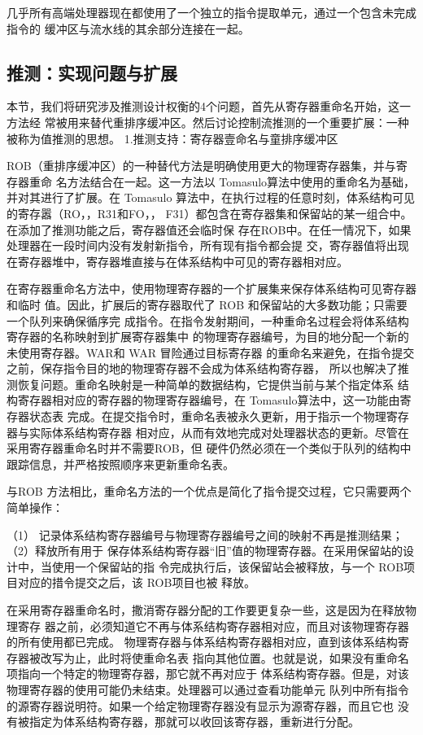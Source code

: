 几乎所有高端处理器现在都使用了一个独立的指令提取单元，通过一个包含未完成指令的
缓冲区与流水线的其余部分连接在一起。
\subsection{推测：实现问题与扩展}

本节，我们将研究涉及推测设计权衡的4个问题，首先从寄存器重命名开始，这一方法经
常被用来替代重排序缓冲区。然后讨论控制流推测的一个重要扩展：一种被称为值推测的思想。
1.推测支持：寄存器壹命名与童排序缓冲区

ROB（重排序缓冲区）的一种替代方法是明确使用更大的物理寄存器集，并与寄存器重命
名方法结合在一起。这一方法以 Tomasulo算法中使用的重命名为基础，并对其进行了扩展。在
Tomasulo 算法中，在执行过程的任意时刻，体系结构可见的寄存嚣（RO，，R31和FO，，
F31）都包含在寄存器集和保留站的某一组合中。在添加了推测功能之后，寄存器值还会临时保
存在ROB中。在任一情况下，如果处理器在一段时间内没有发射新指令，所有现有指令都会提
交，寄存器值将出现在寄存器堆中，寄存器堆直接与在体系结构中可见的寄存器相对应。

在寄存器重命名方法中，使用物理寄存器的一个扩展集来保存体系结构可见寄存器和临时
值。因此，扩展后的寄存器取代了 ROB 和保留站的大多数功能；只需要一个队列来确保循序完
成指令。在指令发射期间，一种重命名过程会将体系结构寄存器的名称映射到扩展寄存器集中
的物理寄存器编号，为目的地分配一个新的未使用寄存器。WAR和 WAR 冒险通过目标寄存器
的重命名来避免，在指令提交之前，保存指令目的地的物理寄存器不会成为体系结构寄存器，
所以也解决了推测恢复问题。重命名映射是一种简单的数据结构，它提供当前与某个指定体系
结构寄存器相对应的寄存器的物理寄存器编号，在 Tomasulo算法中，这一功能由寄存器状态表
完成。在提交指令时，重命名表被永久更新，用于指示一个物理寄存器与实际体系结构寄存器
相对应，从而有效地完成对处理器状态的更新。尽管在采用寄存器重命名时并不需要ROB，但
硬件仍然必须在一个类似于队列的结构中跟踪信息，并严格按照顺序来更新重命名表。

与ROB 方法相比，重命名方法的一个优点是简化了指令提交过程，它只需要两个简单操作：

（1） 记录体系结构寄存器编号与物理寄存器编号之间的映射不再是推测结果；（2）释放所有用于
保存体系结构寄存器“旧”值的物理寄存器。在采用保留站的设计中，当使用一个保留站的指
令完成执行后，该保留站会被释放，与一个 ROB项目对应的措令提交之后，该 ROB项目也被
释放。

在采用寄存器重命名时，撒消寄存器分配的工作要更复杂一些，这是因为在释放物理寄存
器之前，必须知道它不再与体系结构寄存器相对应，而且对该物理寄存器的所有使用都已完成。
物理寄存器与体系结构寄存器相对应，直到该体系结构寄存器被改写为止，此时将使重命名表
指向其他位置。也就是说，如果没有重命名项指向一个特定的物理寄存器，那它就不再对应于
体系结构寄存器。但是，对该物理寄存器的使用可能仍未结束。处理器可以通过查看功能单元
队列中所有指令的源寄存器说明符。如果一个给定物理寄存器没有显示为源寄存器，而且它也
没有被指定为体系结构寄存器，那就可以收回该寄存器，重新进行分配。

